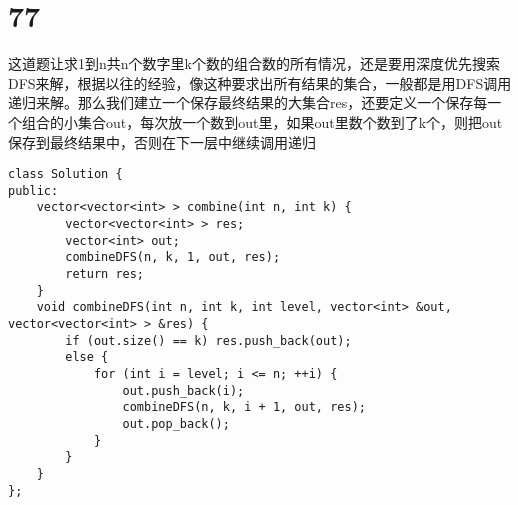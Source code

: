 \documentclass[12pt,a4paper]{article}
\begin{document}
\section{77}
\begin{CJK}{UTF8}{gbsn}
这道题让求1到n共n个数字里k个数的组合数的所有情况，还是要用深度优先搜索DFS来解，根据以往的经验，像这种要求出所有结果的集合，一般都是用DFS调用递归来解。那么我们建立一个保存最终结果的大集合res，还要定义一个保存每一个组合的小集合out，每次放一个数到out里，如果out里数个数到了k个，则把out保存到最终结果中，否则在下一层中继续调用递归
\end{CJK}
\begin{lstlisting}
class Solution {
public:
	vector<vector<int> > combine(int n, int k) {
		vector<vector<int> > res;
		vector<int> out;
		combineDFS(n, k, 1, out, res);
		return res;
	}
	void combineDFS(int n, int k, int level, vector<int> &out, vector<vector<int> > &res) {
		if (out.size() == k) res.push_back(out);
		else {
			for (int i = level; i <= n; ++i) {
				out.push_back(i);
				combineDFS(n, k, i + 1, out, res);
				out.pop_back();
			}
		}
	}
};
\end{lstlisting}
\end{document}
